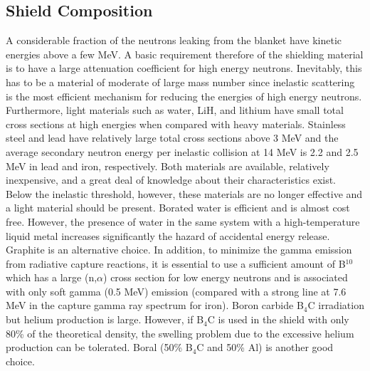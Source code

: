 \documentclass[11pt]{report} %
\begin{document}
\subsection{Shield Composition}
A considerable fraction of the neutrons leaking from the blanket have kinetic energies above a few MeV. A basic requirement therefore of the shielding material is to have a large attenuation coefficient for high energy neutrons. Inevitably, this has to be a material of moderate of large mass number since inelastic scattering is the most efficient mechanism for reducing the energies of high energy neutrons. Furthermore, light materials such as water, LiH, and lithium have small total cross sections at high energies when compared with heavy materials. Stainless steel and lead have relatively large total cross sections above 3 MeV and the average secondary neutron energy per inelastic collision at 14 MeV is 2.2 and 2.5 MeV in lead and iron, respectively. Both materials are available, relatively inexpensive, and a great deal of knowledge about their characteristics exist. Below the inelastic threshold, however, these materials are no longer effective and a light material should be present. Borated water is efficient and is almost cost free. However, the presence of water in the same system with a high-temperature liquid metal increases significantly the hazard of accidental energy release. Graphite is an alternative choice. In addition, to minimize the gamma emission from radiative capture reactions, it is essential to use a sufficient amount of B$^10$ which has a large (n,$\alpha$) cross section for low energy neutrons and is associated with only soft gamma (0.5 MeV) emission (compared with a strong line at 7.6 MeV in the capture gamma ray spectrum for iron). Boron carbide B$_4$C irradiation but helium production is large. However, if B$_4$C is used in the shield with only 80\% of the theoretical density, the swelling problem due to the excessive helium production can be tolerated. Boral (50\% B$_4$C and 50\% Al) is another good choice.
\end{document}

